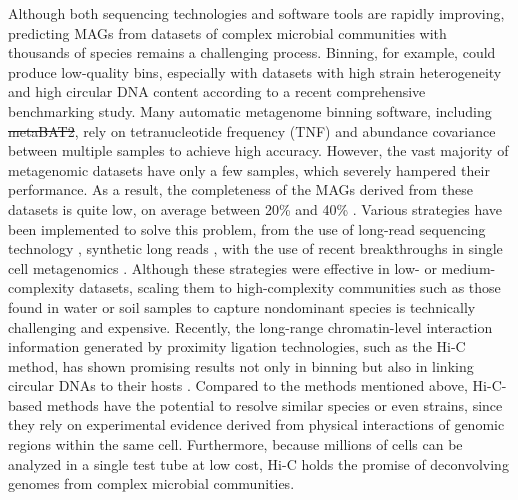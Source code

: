 \documentclass[fleqn,10pt,lineno]{wlpeerj}
\providecommand{\DIFaddtex}[1]{{\protect\color{blue}\uwave{#1}}} %
\providecommand{\DIFdeltex}[1]{{\protect\color{red}\sout{#1}}}                      %
\providecommand{\DIFaddbegin}{} %
\providecommand{\DIFaddend}{} %
\providecommand{\DIFdelbegin}{} %
\providecommand{\DIFdelend}{} %
\providecommand{\DIFadd}[1]{\texorpdfstring{\DIFaddtex{#1}}{#1}} %
\providecommand{\DIFdel}[1]{\texorpdfstring{\DIFdeltex{#1}}{}} %
\newcommand{\DIFscaledelfig}{0.5}
\newlength{\DIFdelgraphicswidth} %
\newlength{\DIFdelgraphicsheight} %
\newcommand{\DIFaddincludegraphics}[2][]{{\color{blue}\fbox{\DIFOincludegraphics[#1]{#2}}}} %
\newcommand{\DIFdelincludegraphics}[2][]{%
\sbox{\DIFdelgraphicsbox}{\DIFOincludegraphics[#1]{#2}}%
\settoboxwidth{\DIFdelgraphicswidth}{\DIFdelgraphicsbox} %
\settoboxtotalheight{\DIFdelgraphicsheight}{\DIFdelgraphicsbox} %
\scalebox{\DIFscaledelfig}{%
\parbox[b]{\DIFdelgraphicswidth}{\usebox{\DIFdelgraphicsbox}\\[-\baselineskip] \rule{\DIFdelgraphicswidth}{0em}}\llap{\resizebox{\DIFdelgraphicswidth}{\DIFdelgraphicsheight}{%
\setlength{\unitlength}{\DIFdelgraphicswidth}%
\begin{picture}(1,1)%
\thicklines\linethickness{2pt} %
{\color[rgb]{1,0,0}\put(0,0){\framebox(1,1){}}}%
{\color[rgb]{1,0,0}\put(0,0){\line( 1,1){1}}}%
{\color[rgb]{1,0,0}\put(0,1){\line(1,-1){1}}}%
\end{picture}%
}\hspace*{3pt}}} %
} %
\DeclareRobustCommand{\DIFaddbegin}{\DIFOaddbegin \let\includegraphics\DIFaddincludegraphics} %
\DeclareRobustCommand{\DIFaddend}{\DIFOaddend \let\includegraphics\DIFOincludegraphics} %
\DeclareRobustCommand{\DIFdelbegin}{\DIFOdelbegin \let\includegraphics\DIFdelincludegraphics} %
\DeclareRobustCommand{\DIFdelend}{\DIFOaddend \let\includegraphics\DIFOincludegraphics} %
\begin{document}
Although both sequencing technologies and software tools are rapidly improving, predicting MAGs from datasets of complex microbial communities with thousands of species remains a challenging process. Binning, for example, could produce low-quality bins, especially with datasets with high strain heterogeneity and high circular DNA content according to a recent comprehensive benchmarking study\citep{meyer2021critical}. Many automatic metagenome binning software, including \DIFdelbegin \DIFdel{metaBAT2}\DIFdelend \DIFaddbegin \DIFadd{metaBAT 2}\DIFaddend , rely on tetranucleotide frequency (TNF) and abundance covariance between multiple samples \citep{kang2019metabat} to achieve high accuracy. However, the vast majority of metagenomic datasets have only a few samples, which severely hampered their performance. As a result, the completeness of the MAGs derived from these datasets is quite low, on average between 20\% and 40\% \citep{meyer2021critical}. Various strategies have been implemented to solve this problem, from the use of long-read sequencing technology \citep{Bickhart2022GeneratingLC, Frank2016ImprovedMA}, synthetic long reads \citep{Chen2019SimpleAS}, 
with the use of recent breakthroughs in single cell metagenomics \citep{Arikawa2021RecoveryOH, bowers2022dissecting}. Although these strategies were effective in low- or medium-complexity datasets, scaling them to high-complexity communities such as those found in water or soil samples to capture nondominant species is technically challenging and expensive. Recently, the long-range chromatin-level interaction information generated by proximity ligation technologies, such as the Hi-C method, has shown promising results not only in binning but also in linking circular DNAs to their hosts \citep{Burton2014SpeciesLevelDO, Beitel2014StrainAP, press2017hi}. Compared to the methods mentioned above, Hi-C-based methods have the potential to resolve similar species or even strains, since they rely on experimental evidence derived from physical interactions of genomic regions within the same cell. Furthermore, because millions of cells can be analyzed in a single test tube at \DIFaddbegin \DIFadd{a }\DIFaddend low cost, Hi-C holds the promise of deconvolving genomes from complex microbial communities.
\end{document}

